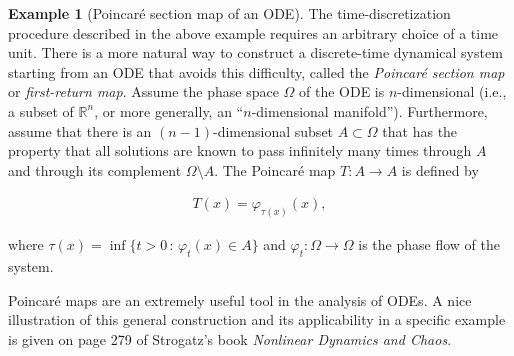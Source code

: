 \documentclass[11pt]{report}
\theoremstyle{plain}
\theoremstyle{definition}
\newtheorem{example}[thm]{Example}
\begin{document}
\begin{example}[Poincaré section map of an ODE]
The time-discretization procedure described in the
above example requires an arbitrary choice of a time
unit. There is a more natural way to construct a
discrete-time dynamical system starting from an ODE
that avoids this difficulty, called the \emph{Poincaré
section map} or \emph{first-return map}. Assume the phase
space $\Omega$ of the ODE is $n$-dimensional (i.e., a
subset of $\mathbb{R}^n$, or more generally, an
``$n$-dimensional manifold''). Furthermore, assume
that there is an $(n-1)$-dimensional subset
$A \subset \Omega$ that has the property that all
solutions are known to pass infinitely many times
through $A$ and through its complement
$\Omega\setminus A$. The Poincaré map $T:A\to A$ is
defined by

\begin{align*}
T(x) = \varphi_{\tau(x)}(x),
\end{align*}

where $\tau(x) = \inf\{ t>0\,:\, \varphi_t(x)\in A\}$
and $\varphi_t:\Omega\to\Omega$ is the phase flow of
the system.

Poincaré maps are an extremely useful tool in the
analysis of ODEs. A nice illustration of this general
construction and its applicability in a specific
example is given on page 279 of Strogatz's book
\emph{Nonlinear Dynamics and Chaos}.
\end{example}
\end{document}
